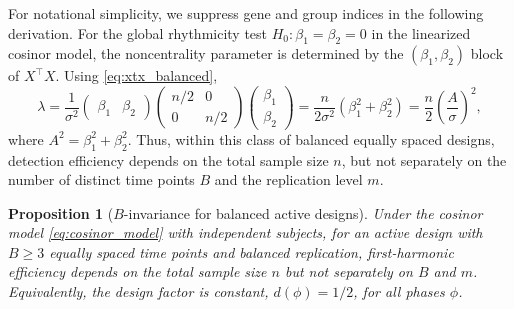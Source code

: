 \documentclass{article}
\newtheorem{proposition}{Proposition}[section]
\begin{document}
For notational simplicity, we suppress gene and group indices in the following
derivation. For the global rhythmicity test
$H_0:\beta_1=\beta_2=0$ in the linearized cosinor model, the noncentrality
parameter is determined by the $(\beta_1,\beta_2)$ block of $X^\top X$. Using
\eqref{eq:xtx_balanced},
\begin{equation}
\lambda
=
\frac{1}{\sigma^2}
\begin{pmatrix}\beta_1 & \beta_2\end{pmatrix}
\begin{pmatrix} n/2 & 0 \\ 0 & n/2 \end{pmatrix}
\begin{pmatrix}\beta_1 \\ \beta_2\end{pmatrix}
=
\frac{n}{2\sigma^2}(\beta_1^2+\beta_2^2)
=
\frac{n}{2}\left(\frac{A}{\sigma}\right)^2,
\label{eq:ncp_active}
\end{equation}
where $A^2=\beta_1^2+\beta_2^2$. Thus, within this class of balanced equally
spaced designs, detection efficiency depends on the total sample size $n$, but
not separately on the number of distinct time points $B$ and the replication
level $m$.

\begin{proposition}[$B$-invariance for balanced active designs]
\label{prop:b_invariance}
Under the cosinor model \eqref{eq:cosinor_model} with independent subjects, for
an active design with $B\geq 3$ equally spaced time points and balanced
replication, first-harmonic efficiency depends on the total sample size $n$ but
not separately on $B$ and $m$. Equivalently, the design factor is constant,
$d(\phi)=1/2$, for all phases $\phi$.
\end{proposition}
\end{document}
